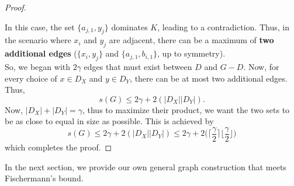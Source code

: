 \documentclass[12pt]{amsart}
\begin{document}
\begin{proof}
\begin{figure}[H]
\end{figure}
In this case, the set $\{a_{j,1},y_j\}$ dominates $K$, leading to a contradiction. Thus, in the scenario where $x_i$ and $y_j$ are adjacent, there can be a maximum of \textbf{two additional edges} ($\{x_i,y_j\}$ and $\{a_{j,1}, b_{i,1}\}$, up to symmetry).\\
So, we began with $2\gamma$ edges that must exist between $D$ and $G-D$. Now, for every choice of $x \in D_X$ and $y \in D_Y$, there can be at most two additional edges. Thus, $$s(G) \leq 2\gamma + 2(|D_X||D_Y|).$$ Now, $|D_X| + |D_Y| = \gamma$, thus to maximize their product, we want the two sets to be as close to equal in size as possible. This is achieved by $$s(G) \leq2\gamma + 2(|D_X||D_Y|) \leq 2\gamma + 2\Big(\Big\lceil\frac{\gamma}{2} \Big\rceil \Big\lfloor\frac{\gamma}{2} \Big\rfloor\Big)$$
which completes the proof.
\end{proof}
In the next section, we provide our own general graph construction that meets Fischermann's bound.
\end{document}
